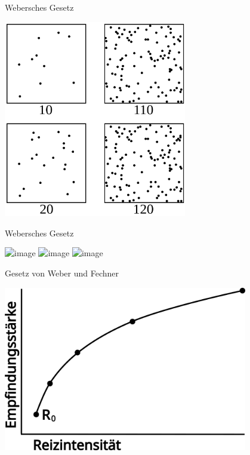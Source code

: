 \documentclass{beamer}
\begin{document}
\begin{frame}{Webersches Gesetz}
\begin{center}
    \includegraphics[width=0.6\textwidth]{Weber-Fechner_law_demo_-_dots.svg.png}
\end{center}
\end{frame}


\begin{frame}{Webersches Gesetz}

\begin{center}
    \includegraphics<1>[width=0.8\textwidth]{weber_fechner_1.png}
    \includegraphics<2>[width=0.8\textwidth]{weber_fechner_2.png}
    \includegraphics<3>[width=0.8\textwidth]{weber_fechner_3.png}
\end{center}
    
\end{frame}


\begin{frame}{Gesetz von Weber und Fechner}

\begin{center}
    \includegraphics[width=0.8\textwidth]{weber_fechner.png}
\end{center}
    


\end{frame}
\end{document}
